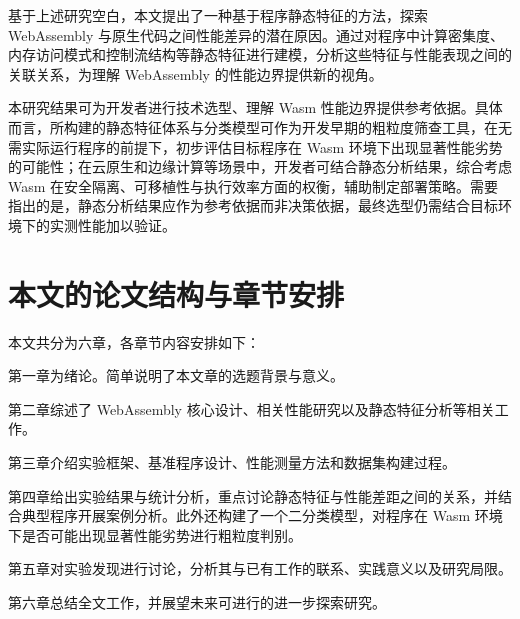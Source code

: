 基于上述研究空白，本文提出了一种基于程序静态特征的方法，探索 WebAssembly 与原生代码之间性能差异的潜在原因。通过对程序中计算密集度、内存访问模式和控制流结构等静态特征进行建模，分析这些特征与性能表现之间的关联关系，为理解 WebAssembly 的性能边界提供新的视角。

本研究结果可为开发者进行技术选型、理解 Wasm 性能边界提供参考依据。具体而言，所构建的静态特征体系与分类模型可作为开发早期的粗粒度筛查工具，在无需实际运行程序的前提下，初步评估目标程序在 Wasm 环境下出现显著性能劣势的可能性；在云原生和边缘计算等场景中，开发者可结合静态分析结果，综合考虑 Wasm 在安全隔离、可移植性与执行效率方面的权衡，辅助制定部署策略。需要指出的是，静态分析结果应作为参考依据而非决策依据，最终选型仍需结合目标环境下的实测性能加以验证。


\section{本文的论文结构与章节安排}

\label{sec:arrangement}

本文共分为六章，各章节内容安排如下：

第一章为绪论。简单说明了本文章的选题背景与意义。

第二章综述了 WebAssembly 核心设计、相关性能研究以及静态特征分析等相关工作。

第三章介绍实验框架、基准程序设计、性能测量方法和数据集构建过程。

第四章给出实验结果与统计分析，重点讨论静态特征与性能差距之间的关系，并结合典型程序开展案例分析。此外还构建了一个二分类模型，对程序在 Wasm 环境下是否可能出现显著性能劣势进行粗粒度判别。

第五章对实验发现进行讨论，分析其与已有工作的联系、实践意义以及研究局限。

第六章总结全文工作，并展望未来可进行的进一步探索研究。